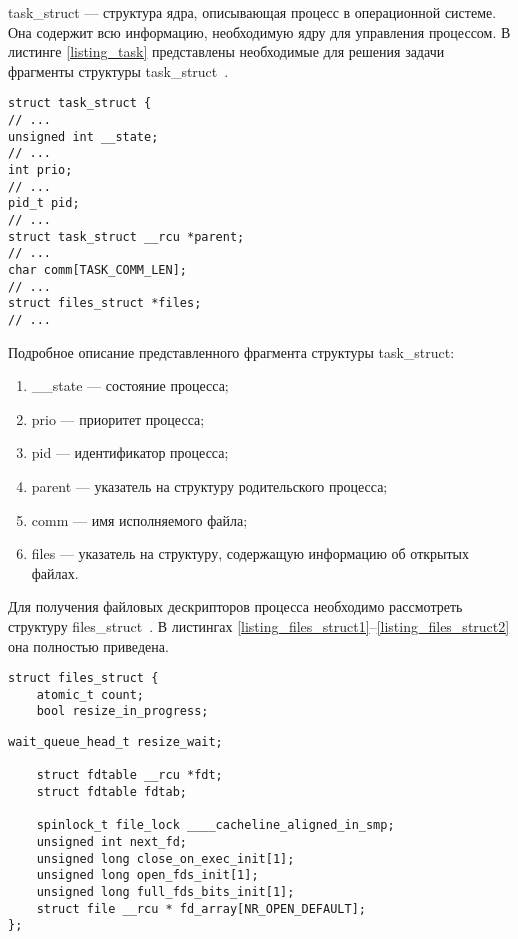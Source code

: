 task\_struct --- структура ядра, описывающая процесс в операционной системе. 
Она содержит всю информацию, необходимую ядру для управления процессом.
В листинге \ref{listing_task} представлены необходимые для решения задачи фрагменты структуры task\_struct~\cite{task_struct}.

\begin{center}
	\begin{lstlisting}[label=listing_task,caption=Структура task\_struct]
struct task_struct {
// ...
unsigned int __state;
// ...
int prio;
// ...
pid_t pid;
// ...
struct task_struct __rcu *parent;
// ...
char comm[TASK_COMM_LEN];
// ...
struct files_struct *files;
// ...
	\end{lstlisting}
\end{center}

Подробное описание представленного фрагмента структуры task\_struct:
\begin{enumerate}
	\item \_\_state --- состояние процесса;
	\item prio --- приоритет процесса;
	\item pid --- идентификатор процесса;
	\item parent --- указатель на структуру родительского процесса;
	\item comm --- имя исполняемого файла;
	\item files --- указатель на структуру, содержащую информацию об открытых файлах.
\end{enumerate}

Для получения файловых дескрипторов процесса необходимо рассмотреть структуру files\_struct~\cite{lsc}.
В листингах \ref{listing_files_struct1}--\ref{listing_files_struct2} она полностью приведена.

\begin{center}
	\begin{lstlisting}[label=listing_files_struct1,caption=Структура files\_struct]
struct files_struct {
	atomic_t count;
	bool resize_in_progress;
	\end{lstlisting}
\end{center}

\begin{center}
	\begin{lstlisting}[label=listing_files_struct2,caption=Структура files\_struct]
	wait_queue_head_t resize_wait;
	
	struct fdtable __rcu *fdt;
	struct fdtable fdtab;

	spinlock_t file_lock ____cacheline_aligned_in_smp;
	unsigned int next_fd;
	unsigned long close_on_exec_init[1];
	unsigned long open_fds_init[1];
	unsigned long full_fds_bits_init[1];
	struct file __rcu * fd_array[NR_OPEN_DEFAULT];
};
	\end{lstlisting}
\end{center}

